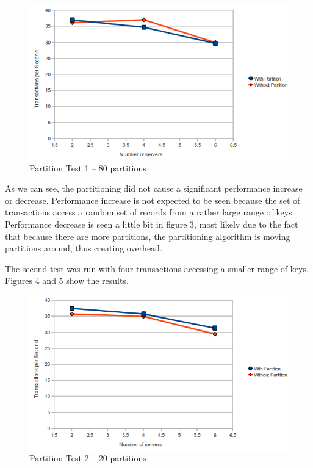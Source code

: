 \documentclass[a4paper, 10pt, notitlepage]{article}
\begin{document}
\begin{figure}[h!]

  \centering
    \includegraphics[scale=0.7]{peval2.png}
  \caption{Partition Test 1 -- 80 partitions}
\end{figure}

As we can see, the partitioning did not cause a significant performance increase or decrease. Performance increase is not expected to be seen because
the set of transactions access a random set of records from a rather large range of keys. Performance decrease is seen a little bit
in figure 3, most likely due to the fact that because there are more partitions, the partitioning algorithm is moving partitions
around, thus creating overhead.

The second test was run with four transactions accessing a smaller range of keys. Figures 4 and 5 show the results.

\begin{figure}[h!]

  \centering
    \includegraphics[scale=0.7]{peval3.png}
  \caption{Partition Test 2 -- 20 partitions}
\end{figure}
\end{document}
